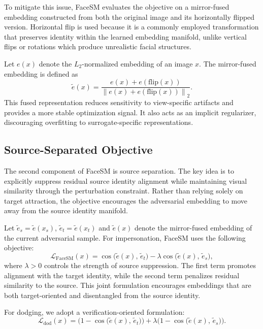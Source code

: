\documentclass[a4paper,fleqn]{cas-dc}
\begin{document}
To mitigate this issue, FaceSM evaluates the objective on a mirror-fused embedding constructed from both the original image and its horizontally flipped version. Horizontal flip is used because it is a commonly employed transformation that preserves identity within the learned embedding manifold, unlike vertical flips or rotations which produce unrealistic facial structures.

Let \( e(x) \) denote the \( L_2 \)-normalized embedding of an image \( x \). The mirror-fused embedding is defined as
\begin{equation}
\tilde{e}(x) =
\frac{e(x) + e(\mathrm{flip}(x))}
{\left\| e(x) + e(\mathrm{flip}(x)) \right\|_2}.
\end{equation}
This fused representation reduces sensitivity to view-specific artifacts and provides a more stable optimization signal. It also acts as an implicit regularizer, discouraging overfitting to surrogate-specific representations.


\subsection{Source-Separated Objective}

The second component of FaceSM is source separation. The key idea is to explicitly suppress residual source identity alignment while maintaining visual similarity through the perturbation constraint. Rather than relying solely on target attraction, the objective encourages the adversarial embedding to move away from the source identity manifold.

Let \( \tilde{e}_s = \tilde{e}(x_s) \), \( \tilde{e}_t = \tilde{e}(x_t) \) and \( \tilde{e}(x) \) denote the mirror-fused embedding of the current adversarial sample. For impersonation, FaceSM uses the following objective:
\begin{equation}
\mathcal{L}_{\mathrm{FaceSM}}(x)
=
\cos\!\big(\tilde{e}(x),\,\tilde{e}_t\big)
-
\lambda \cos\!\big(\tilde{e}(x),\,\tilde{e}_s\big),
\end{equation}
where \( \lambda > 0 \) controls the strength of source suppression. The first term promotes alignment with the target identity, while the second term penalizes residual similarity to the source. This joint formulation encourages embeddings that are both target-oriented and disentangled from the source identity.

For dodging, we adopt a verification-oriented formulation:
\begin{equation}
\mathcal{L}_{\mathrm{dod}}(x)
=
\big(1 - \cos\!\big(\tilde{e}(x),\,\tilde{e}_t\big)\big)
+
\lambda \big(1 - \cos\!\big(\tilde{e}(x),\,\tilde{e}_s\big)\big).
\end{equation}
\end{document}
